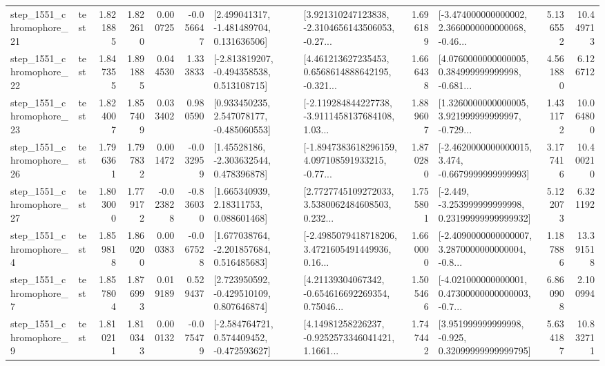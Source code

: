 \begin{tabular}{llrrrrllrlrr}
 step\_1551\_chromophore\_21 &      test &      1.821885 &    1.822610 &      0.000725 & -0.056647 &    [2.499041317, -1.481489704, 0.131636506] &  [3.921310247123838, -2.3104656143506053, -0.27... &       1.696189 &  [-3.474000000000002, 2.3660000000000068, -0.46... &            5.136552 &         10.449713 \\
 step\_1551\_chromophore\_22 &      test &      1.847355 &    1.891885 &      0.044530 &  1.333833 &   [-2.813819207, -0.494358538, 0.513108715] &  [4.461213627235453, 0.6568614888642195, -0.321... &       1.666438 &  [4.0760000000000005, 0.384999999999998, -0.681... &            4.561880 &          6.126712 \\
 step\_1551\_chromophore\_23 &      test &      1.824007 &    1.857409 &      0.033402 &  0.980590 &    [0.933450235, 2.547078177, -0.485060553] &  [-2.119284844227738, -3.9111458137684108, 1.03... &       1.889607 &  [1.3260000000000005, 3.921999999999997, -0.729... &            1.431172 &         10.064800 \\
 step\_1551\_chromophore\_26 &      test &      1.796361 &    1.797832 &      0.001472 & -0.032959 &     [1.45528186, -2.303632544, 0.478396878] &  [-1.8947383618296159, 4.097108591933215, -0.77... &       1.870280 &  [-2.4620000000000015, 3.474, -0.6679999999999993] &            3.177416 &         10.400210 \\
 step\_1551\_chromophore\_27 &      test &      1.803000 &    1.779172 &     -0.023828 & -0.836030 &      [1.665340939, 2.18311753, 0.088601468] &  [2.7727745109272033, 3.5380062484608503, 0.232... &       1.755801 &  [-2.449, -3.253999999999998, 0.23199999999999932] &            5.122073 &          6.321192 \\
  step\_1551\_chromophore\_4 &      test &      1.859818 &    1.860200 &      0.000383 & -0.067528 &    [1.677038764, -2.201857684, 0.516485683] &  [-2.4985079418718206, 3.4721605491449936, 0.16... &       1.660000 &  [-2.4090000000000007, 3.2870000000000004, -0.8... &            1.187886 &         13.391518 \\
  step\_1551\_chromophore\_7 &      test &      1.857804 &    1.876993 &      0.019189 &  0.529437 &    [2.723950592, -0.429510109, 0.807646874] &  [4.21139304067342, -0.654616692269354, 0.75046... &       1.505466 &  [-4.021000000000001, 0.47300000000000003, -0.7... &            6.860908 &          2.100994 \\
  step\_1551\_chromophore\_9 &      test &      1.810211 &    1.810343 &      0.000132 & -0.075479 &   [-2.584764721, 0.574409452, -0.472593627] &  [4.14981258226237, -0.9252573346041421, 1.1661... &       1.747442 &   [3.951999999999998, -0.925, 0.32099999999999795] &            5.634187 &         10.832711 \\

\end{tabular}
